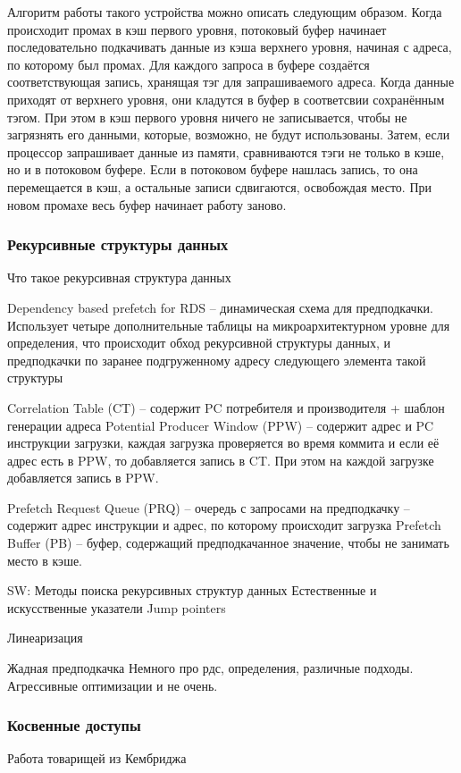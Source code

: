 \documentclass[12pt,a4paper]{article}
\begin{document}
Алгоритм работы такого устройства можно описать следующим образом. Когда происходит промах в кэш первого уровня, потоковый буфер начинает последовательно подкачивать данные из кэша верхнего уровня, начиная с адреса, по которому был промах. Для каждого запроса в буфере создаётся соответствующая запись, хранящая тэг для запрашиваемого адреса. Когда данные приходят от верхнего уровня, они кладутся в буфер в соответсвии сохранённым тэгом. При этом в кэш первого уровня ничего не записывается, чтобы не загрязнять его данными, которые, возможно, не будут использованы. Затем, если процессор запрашивает данные из памяти, сравниваются тэги не только в кэше, но и в потоковом буфере. Если в потоковом буфере нашлась запись, то она перемещается в кэш, а остальные записи сдвигаются, освобождая место. При новом промахе весь буфер начинает работу заново.

\subsubsection{Рекурсивные структуры данных}

Что такое рекурсивная структура данных

Dependency based prefetch for RDS -- динамическая схема для предподкачки. Использует четыре дополнительные таблицы на микроархитектурном уровне для определения, что происходит обход рекурсивной структуры данных, и предподкачки по заранее подгруженному адресу следующего элемента такой структуры

Correlation Table (CT) -- содержит PC потребителя и производителя + шаблон генерации адреса
Potential Producer Window (PPW) -- содержит адрес и PC инструкции загрузки, каждая загрузка проверяется во время коммита и если её адрес есть в PPW, то добавляется запись в CT. При этом на каждой загрузке добавляется запись в PPW.

Prefetch Request Queue (PRQ) -- очередь с запросами на предподкачку -- содержит адрес инструкции и адрес, по которому происходит загрузка
Prefetch Buffer (PB) -- буфер, содержащий предподкачанное значение, чтобы не занимать место в кэше.

SW:
Методы поиска рекурсивных структур данных
Естественные и искусственные указатели
Jump pointers

Линеаризация

Жадная предподкачка
Немного про рдс, определения, различные подходы. Агрессивные оптимизации и не очень.

\subsubsection{Косвенные доступы}
Работа товарищей из Кембриджа
\end{document}
